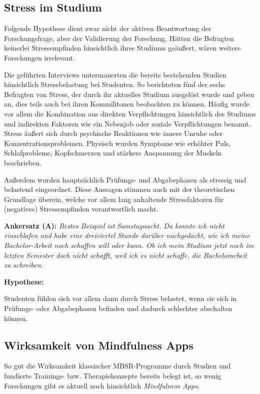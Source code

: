 \documentclass[10pt]{article}
\begin{document}
\subsection{Stress im Studium}
Folgende Hypothese dient zwar nicht der aktiven Beantwortung der Forschungsfrage, aber der Validierung der Forschung. Hätten die Befragten keinerlei Stressempfinden hinsichtlich ihres Studiums geäußert, wären weitere Forschungen irrelevant.

Die geführten Interviews untermauerten die bereits bestehenden Studien hinsichtlich Stressbelastung bei Studenten. So berichteten fünf der sechs Befragten von Stress, der durch ihr aktuelles Studium ausgelöst wurde und geben an, dies teils auch bei ihren Kommilitonen beobachten zu können.
Häufig wurde vor allem die Kombination aus direkten Verpflichtungen hinsichtlich des Studiums und indirekten Faktoren wie ein Nebenjob oder soziale Verpflichtungen benannt.
Stress äußert sich durch psychische Reaktionen wie innere Unruhe oder Konzentrationsproblemen. Physisch wurden Symptome wie erhöhter Puls, Schlafprobleme, Kopfschmerzen und stärkere Anspannung der Muskeln beschrieben.

Außerdem wurden hauptsächlich Prüfungs- und Abgabephasen als stressig und belastend eingeordnet. Diese Aussagen stimmen auch mit der theoretischen Grundlage überein, welche vor allem lang anhaltende Stressfaktoren für (negatives) Stressempfinden verantwortlich macht.

\medskip

\textbf{Ankersatz (A):}
\grqq \textit{Bestes Beispiel ist Samstagnacht. Da konnte ich nicht einschlafen und habe eine dreiviertel Stunde darüber nachgedacht, wie ich meine Bachelor-Arbeit noch schaffen will oder kann. Ob ich mein Studium jetzt noch im letzten Semester doch nicht schafft, weil ich es nicht schaffe, die Bachelorarbeit zu schreiben.}\grqq\

\medskip

\textbf{Hypothese: }

Studenten fühlen sich vor allem dann durch Stress belastet, wenn sie sich in Prüfungs- oder Abgabephasen befinden und dadurch schlechter abschalten können.


\subsection{Wirksamkeit von Mindfulness Apps}
So gut die Wirksamkeit klassischer MBSR-Programme durch Studien und fundierte Trainings- bzw. Therapiekonzepte bereits belegt ist, so wenig Forschungen gibt es aktuell noch hinsichtlich \textit{Mindfulness Apps}.
\end{document}
